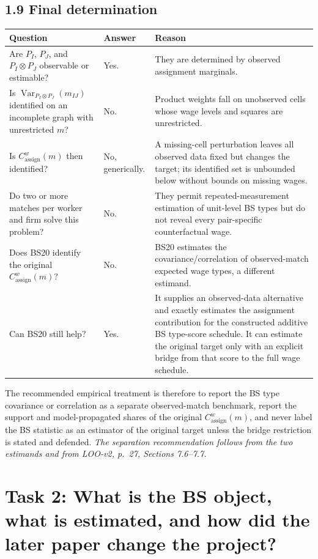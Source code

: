 \documentclass[11pt]{article}
\begin{document}
\subsection{1.9 Final determination}

\begin{longtable}{p{}p{}p{}}
\textbf{Question} & \textbf{Answer} & \textbf{Reason} \\
\hline
Are \(P_I\), \(P_J\), and \(P_I\otimes P_J\) observable or estimable? &
Yes. & They are determined by observed assignment marginals. \\
Is
\(\operatorname{Var}_{P_I\otimes P_J}(m_{IJ})\) identified on an incomplete
graph with unrestricted \(m\)? &
No. & Product weights fall on unobserved cells whose wage levels and squares
are unrestricted. \\
Is \(C^w_{\mathrm{assign}}(m)\) then identified? &
No, generically. & A missing-cell perturbation leaves all observed data fixed
but changes the target; its identified set is unbounded below without bounds
on missing wages. \\
Do two or more matches per worker and firm solve this problem? &
No. & They permit repeated-measurement estimation of unit-level BS types but
do not reveal every pair-specific counterfactual wage. \\
Does BS20 identify the original \(C^w_{\mathrm{assign}}(m)\)? &
No. & BS20 estimates the covariance/correlation of observed-match expected
wage types, a different estimand. \\
Can BS20 still help? &
Yes. & It supplies an observed-data alternative and exactly estimates the
assignment contribution for the constructed additive BS type-score schedule.
It can estimate the original target only with an explicit bridge from that
score to the full wage schedule. \\
\end{longtable}

The recommended empirical treatment is therefore to report the BS type
covariance or correlation as a separate observed-match benchmark, report the
support and model-propagated shares of the original
\(C^w_{\mathrm{assign}}(m)\), and never label the BS statistic as an estimator
of the original target unless the bridge restriction is stated and defended.
\textit{The separation recommendation follows from the two estimands and from
LOO-v2, p.\ 27, Sections 7.6--7.7.}

\section{Task 2: What is the BS object, what is estimated, and how did the later paper change the project?}
\end{document}
